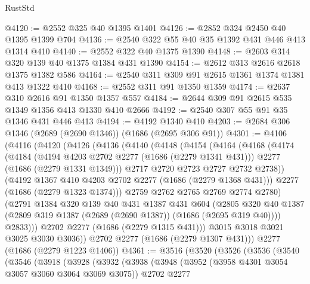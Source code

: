\begin{lexlean}{RustStd}
\begin{coremodule}
@4120 := @2552 @325 @40 @1395 @1401
@4126 := @2852 @324 @2450 @40 @1395 @1399 @704
@4136 := @2540 @322 @55 @40 @35 @1392 @431 @446 @413 @1314 @410
@4140 := @2552 @322 @40 @1375 @1390
@4148 := @2603 @314 @320 @139 @40 @1375 @1384 @431 @1390
@4154 := @2612 @313 @2616 @2618 @1375 @1382 @586
@4164 := @2540 @311 @309 @91 @2615 @1361 @1374 @1381 @413 @1322 @410
@4168 := @2552 @311 @91 @1350 @1359
@4174 := @2637 @310 @2616 @91 @1350 @1357 @557
@4184 := @2644 @309 @91 @2615 @535 @1349 @1356 @413 @1330 @410 @2666
@4192 := @2540 @307 @55 @91 @35 @1346 @431 @446 @413
@4194 := @4192 @1340 @410
@4203 := @2684 @306 @1346 (@2689 (@2690 @1346)) (@1686 (@2695 @306 @91))
@4301 := @4106
    (@4116
      (@4120
        (@4126
          (@4136
            (@4140
              (@4148
                (@4154
                  (@4164
                    (@4168
                      (@4174
                        (@4184
                          (@4194 @4203 @2702 @2277 (@1686 (@2279 @1341 @431)))
                          @2277
                          (@1686 (@2279 @1331 @1349)))
                        @2717
                        @2720
                        @2723
                        @2727
                        @2732
                        @2738))
                    (@4192 @1367 @410 @4203 @2702 @2277 (@1686 (@2279 @1368 @431)))
                    @2277
                    (@1686 (@2279 @1323 @1374)))
                  @2759
                  @2762
                  @2765
                  @2769
                  @2774
                  @2780)
                (@2791
                  @1384
                  @320
                  @139
                  @40
                  @431
                  @1387
                  @431
                  @604
                  (@2805
                    @320
                    @40
                    @1387
                    (@2809 @319 @1387 (@2689 (@2690 @1387)) (@1686 (@2695 @319 @40))))
                  @2833)))
            @2702
            @2277
            (@1686 (@2279 @1315 @431)))
          @3015
          @3018
          @3021
          @3025
          @3030
          @3036))
      @2702
      @2277
      (@1686 (@2279 @1307 @431)))
    @2277
    (@1686 (@2279 @1223 @1406))
@4361 := @3516
    (@3520
      (@3526
        (@3536
          (@3540
            (@3546
              (@3918
                (@3928
                  (@3932
                    (@3938
                      (@3948
                        (@3952 (@3958 @4301 @3054 @3057 @3060 @3064 @3069 @3075))
                        @2702
                        @2277

\end{coremodule}
\end{lexlean}
